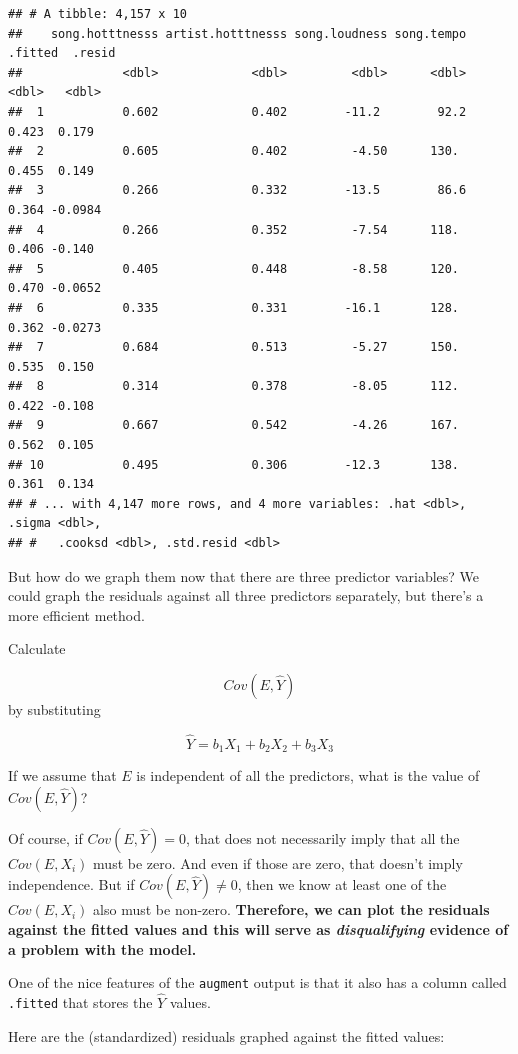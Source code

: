 \documentclass[
]{book}
\begin{document}
\begin{verbatim}
## # A tibble: 4,157 x 10
##    song.hotttnesss artist.hotttnesss song.loudness song.tempo .fitted  .resid
##              <dbl>             <dbl>         <dbl>      <dbl>   <dbl>   <dbl>
##  1           0.602             0.402        -11.2        92.2   0.423  0.179 
##  2           0.605             0.402         -4.50      130.    0.455  0.149 
##  3           0.266             0.332        -13.5        86.6   0.364 -0.0984
##  4           0.266             0.352         -7.54      118.    0.406 -0.140 
##  5           0.405             0.448         -8.58      120.    0.470 -0.0652
##  6           0.335             0.331        -16.1       128.    0.362 -0.0273
##  7           0.684             0.513         -5.27      150.    0.535  0.150 
##  8           0.314             0.378         -8.05      112.    0.422 -0.108 
##  9           0.667             0.542         -4.26      167.    0.562  0.105 
## 10           0.495             0.306        -12.3       138.    0.361  0.134 
## # ... with 4,147 more rows, and 4 more variables: .hat <dbl>, .sigma <dbl>,
## #   .cooksd <dbl>, .std.resid <dbl>
\end{verbatim}

But how do we graph them now that there are three predictor variables? We could graph the residuals against all three predictors separately, but there's a more efficient method.

Calculate

\[
Cov(E, \hat{Y})
\]
by substituting

\[
\hat{Y} = b_{1}X_{1} + b_{2}X_{2} + b_{3}X_{3} 
\]

If we assume that \(E\) is independent of all the predictors, what is the value of \(Cov(E, \hat{Y})\)?

Of course, if \(Cov(E, \hat{Y}) = 0\), that does not necessarily imply that all the \(Cov(E, X_{i})\) must be zero. And even if those are zero, that doesn't imply independence. But if \(Cov(E, \hat{Y}) \neq 0\), then we know at least one of the \(Cov(E, X_{i})\) also must be non-zero. \textbf{Therefore, we can plot the residuals against the fitted values and this will serve as \emph{disqualifying} evidence of a problem with the model.}

One of the nice features of the \texttt{augment} output is that it also has a column called \texttt{.fitted} that stores the \(\hat{Y}\) values.

Here are the (standardized) residuals graphed against the fitted values:
\end{document}
